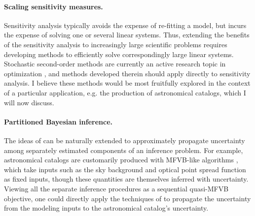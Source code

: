 
\paragraph{Scaling sensitivity measures.}

Sensitivity analysis typically avoids the expense of re-fitting a model, but
incurs the expense of solving one or several linear systems.  Thus, extending
the benefits of the sensitivity analysis to increasingly large scientific
problems requires developing methods to efficiently solve correspondingly large
linear systems.  Stochastic second-order methods are currently an active
research topic in optimization \citep{agarwal:2017:secondorder,
berahas:2020:newtonsketch}, and methods developed therein should apply
directly to sensitivity analysis.  I believe these methods would be most
fruitfully explored in the context of a particular application, e.g.
the production of astronomical catalogs, which I will now discuss.

\paragraph{Partitioned Bayesian inference.}

The ideas of \citep{giordano:2018:covariances} can be naturally extended to
approximately propagate uncertainty among separately estimated components of an
inference problem.  For example, astronomical catalogs are customarily produced
with MFVB-like algorithms \citep{lang:2016:tractor, regier:2019:cataloging},
which take inputs such as the sky background and optical point spread function
as fixed inputs, though these quantities are themselves inferred with
uncertainty.  Viewing all the separate inference procedures as a sequential
quasi-MFVB objective, one could directly apply the techniques of
\citep{giordano:2018:covariances} to propagate the uncertainty from the modeling
inputs to the astronomical catalog's uncertainty.



\newpage





